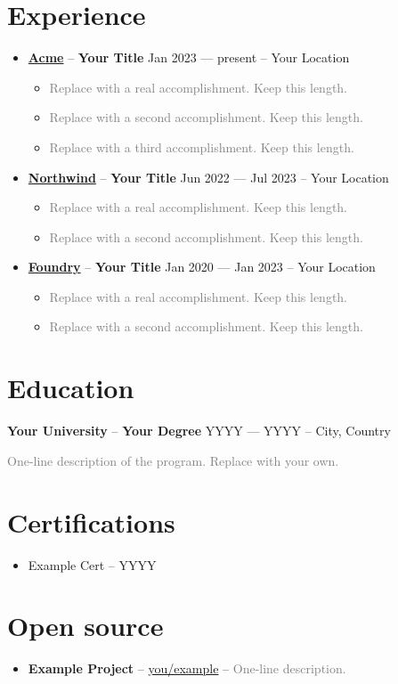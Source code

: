 \documentclass[12pt,letterpaper]{article}
\newcommand{\resumeItem}[1]{\item\normalsize{\textcolor{gray}{#1} \vspace{0pt}}}
\newcommand{\resumeSubheading}[4]{
\vspace{8pt}\item
\textbf{#1} -- \textrm{\textbf{#3}} \hfill {\normalsize #4 -- #2} \vspace{-2pt}
}
\begin{document}
\section{Experience}
\begin{itemize}[label={}, labelwidth=0pt, labelsep=0pt]

\resumeSubheading
{\href{https://example.com}{Acme}}{Your Location}
{Your Title}{Jan 2023 --- present}
\begin{itemize}[label={\textbullet}]
\resumeItem{Replace with a real accomplishment. Keep this length.}
\resumeItem{Replace with a second accomplishment. Keep this length.}
\resumeItem{Replace with a third accomplishment. Keep this length.}
\end{itemize}

\resumeSubheading
{\href{https://example.com}{Northwind}}{Your Location}
{Your Title}{Jun 2022 --- Jul 2023}
\begin{itemize}[label={\textbullet}]
\resumeItem{Replace with a real accomplishment. Keep this length.}
\resumeItem{Replace with a second accomplishment. Keep this length.}
\end{itemize}

\resumeSubheading
{\href{https://example.com}{Foundry}}{Your Location}
{Your Title}{Jan 2020 --- Jan 2023}
\begin{itemize}[label={\textbullet}]
\resumeItem{Replace with a real accomplishment. Keep this length.}
\resumeItem{Replace with a second accomplishment. Keep this length.}
\end{itemize}

\end{itemize}

\section{Education}
\vspace{2pt}
{\normalsize
\noindent\textbf{Your University} -- \textrm{\textbf{Your Degree}} \hfill {\normalsize YYYY --- YYYY -- City, Country}\par
\vspace{2pt}
{\textcolor{gray}{One-line description of the program. Replace with your own.}}
}

\section{Certifications}
\begin{itemize}[label={}, labelwidth=0pt, labelsep=0pt, itemsep=2pt]
\normalsize
\item[] Example Cert -- YYYY
\end{itemize}

\section{Open source}
\begin{itemize}[label={}, labelwidth=0pt, labelsep=0pt, itemsep=2pt]
\normalsize
\item[] \textbf{Example Project} -- \href{https://github.com/you/example}{you/example} -- \textcolor{gray}{One-line description.}
\end{itemize}
\end{document}
